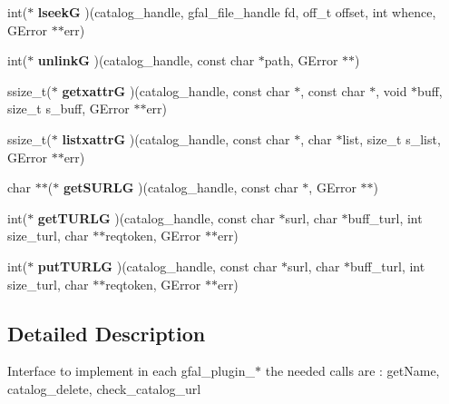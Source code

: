\begin{CompactItemize}
\item 
int($\ast$ \textbf{lseek\-G} )(catalog\_\-handle, gfal\_\-file\_\-handle fd, off\_\-t offset, int whence, GError $\ast$$\ast$err)\label{struct__gfal__catalog__interface_7f66631bd2d7919666ea9383e55c5837}

\item 
int($\ast$ \textbf{unlink\-G} )(catalog\_\-handle, const char $\ast$path, GError $\ast$$\ast$)\label{struct__gfal__catalog__interface_1fc0c9cbd8821484dc6d2532ebdc2b28}

\item 
ssize\_\-t($\ast$ \textbf{getxattr\-G} )(catalog\_\-handle, const char $\ast$, const char $\ast$, void $\ast$buff, size\_\-t s\_\-buff, GError $\ast$$\ast$err)\label{struct__gfal__catalog__interface_8d6974ac822e7360db9ec11f88aa787d}

\item 
ssize\_\-t($\ast$ \textbf{listxattr\-G} )(catalog\_\-handle, const char $\ast$, char $\ast$list, size\_\-t s\_\-list, GError $\ast$$\ast$err)\label{struct__gfal__catalog__interface_33b6ee495d6dbdf44097eab70094953f}

\item 
char $\ast$$\ast$($\ast$ \textbf{get\-SURLG} )(catalog\_\-handle, const char $\ast$, GError $\ast$$\ast$)\label{struct__gfal__catalog__interface_8a79a58a74fb3f7e4da85247d60d0323}

\item 
int($\ast$ \textbf{get\-TURLG} )(catalog\_\-handle, const char $\ast$surl, char $\ast$buff\_\-turl, int size\_\-turl, char $\ast$$\ast$reqtoken, GError $\ast$$\ast$err)\label{struct__gfal__catalog__interface_f2664982e4ee83af2145ea7e190f1169}

\item 
int($\ast$ \textbf{put\-TURLG} )(catalog\_\-handle, const char $\ast$surl, char $\ast$buff\_\-turl, int size\_\-turl, char $\ast$$\ast$reqtoken, GError $\ast$$\ast$err)\label{struct__gfal__catalog__interface_19227139e261ebb890bff5d22c20322a}

\end{CompactItemize}


\subsection{Detailed Description}
Interface to implement in each gfal\_\-plugin\_\-$\ast$ the needed calls are : get\-Name, catalog\_\-delete, check\_\-catalog\_\-url 



